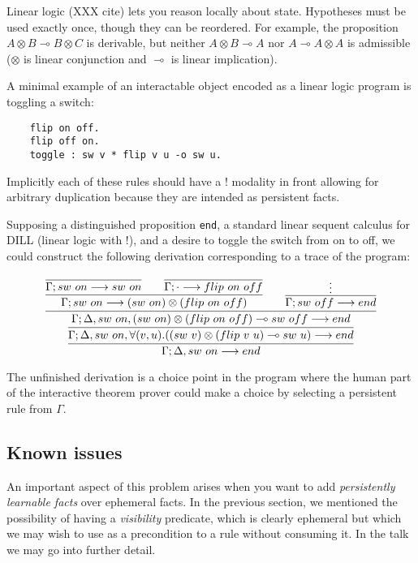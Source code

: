 \newcommand{\lolli}{\multimap}

Linear logic (XXX cite) lets you reason locally about state. Hypotheses must be used
exactly once, though they can be reordered. For example, the proposition $A
\otimes B \lolli B \otimes C$ is derivable, but neither $A \otimes B \lolli
A$ nor $A \lolli A \otimes A$ is admissible ($\otimes$ is linear
conjunction and $\lolli$ is linear implication).

A minimal example of an interactable object encoded as a linear logic
program is toggling a switch:

\begin{verbatim}
    flip on off.
    flip off on.
    toggle : sw v * flip v u -o sw u.
\end{verbatim}

Implicitly each of these rules should have a $!$ modality in front allowing
for arbitrary duplication because they are intended as persistent facts.

Supposing a distinguished proposition \verb|end|, a standard linear sequent
calculus for DILL (linear logic with $!$), and a desire to toggle the
switch from on to off, we could construct the following derivation
corresponding to a trace of the program:

\small{
\[
\infer
{
  \Gamma; \Delta, sw\ on \longrightarrow end
}
{
  \infer
  {
    \Gamma; \Delta, sw\ on, \forall(v,u).((sw\ v)\otimes (flip\ v\
    u)\multimap sw\ u)
    \longrightarrow end
  }
  {
  \infer
    {
    \Gamma; \Delta, sw\ on, (sw\ on)\otimes (flip\ on\ off)\multimap sw\
    off
    \longrightarrow end
    }
    {
        \infer{
          \Gamma; sw\ on \longrightarrow (sw\ on)\otimes(flip\ on\ off)
          }
          {
            \infer
            {\Gamma; sw\ on \longrightarrow sw\ on}
            {}
            \qquad
            \infer
            {\Gamma; \cdot \longrightarrow flip\ on\ off}
            {}
          }
        \qquad
        \infer{
          \Gamma; sw\ off \longrightarrow end
          }
          {\vdots
          }
    }
  }
}
\]
}

The unfinished derivation is a choice point in the program where the human
part of the interactive theorem prover could make a choice by selecting a
persistent rule from $\Gamma$. 

\subsection{Known issues}

An important aspect of this problem arises when you want to add {\em
persistently learnable facts} over ephemeral facts. In the previous
section, we mentioned the possibility of having a {\em visibility}
predicate, which is clearly ephemeral but which we may wish to use as a
precondition to a rule without consuming it. In the talk we may go into
further detail.
